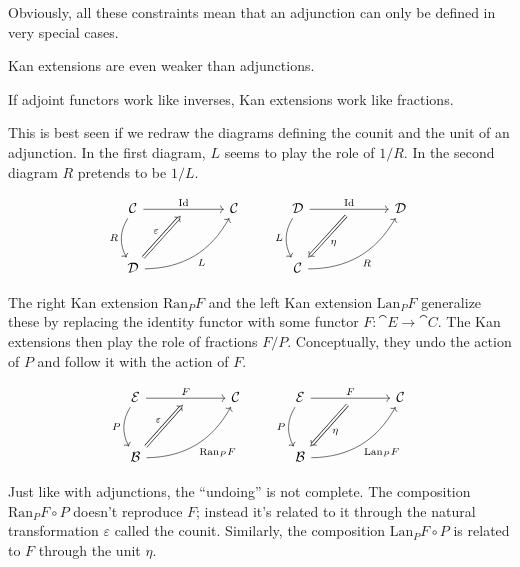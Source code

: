 \documentclass[DaoFP]{subfiles}
\begin{document}
Obviously, all these constraints mean that an adjunction can only be defined in very special cases. 

Kan extensions are even weaker than adjunctions. 

If adjoint functors work like inverses, Kan extensions work like fractions. 

This is best seen if we redraw the diagrams defining the counit and the unit of an adjunction. In the first diagram, $L$ seems to play the role of $1/R$. In the second diagram $R$ pretends to be $1/L$.

\[
 \begin{tikzcd} [row sep=1cm, column sep=1cm]
 \cat C
 \arrow[rr, "\text{Id}", "" {name=ID, below} ]
 \arrow[d, bend right, "R"']
 && \cat C
 \\
 \cat D
  \arrow[urr, bend right, "L"']
 \arrow[Rightarrow, "\varepsilon",  to=ID]
 \end{tikzcd}
 \qquad
 \begin{tikzcd} [row sep=1cm, column sep=1cm]
 \cat D
 \arrow[rr, "\text{Id}", "" {name=ID, below} ]
 \arrow[d, bend right, "L"']
 && \cat D
 \\
 \cat C
  \arrow[urr, bend right, "R"']
 \arrow[Rightarrow, "\eta",  from=ID]
 \end{tikzcd}
\]

The right Kan extension $\text{Ran}_P F$ and the left Kan extension $\text{Lan}_P F$ generalize these by replacing the identity functor with some functor $F \colon \cat E \to \cat C$. The Kan extensions then play the role of fractions $F/P$. Conceptually, they undo the action of $P$ and follow it with the action of $F$.

\[
 \begin{tikzcd} [row sep=1cm, column sep=1cm]
 \cat E
 \arrow[rr, "F", "" {name=ID, below} ]
 \arrow[d, bend right, "P"']
 && \cat C
 \\
 \cat B
  \arrow[urr, bend right, "\text{Ran}_P F"']
 \arrow[Rightarrow, "\varepsilon",  to=ID]
 \end{tikzcd}
 \qquad
 \begin{tikzcd} [row sep=1cm, column sep=1cm]
 \cat E
 \arrow[rr, "F", "" {name=ID, below} ]
 \arrow[d, bend right, "P"']
 && \cat C
 \\
 \cat B
  \arrow[urr, bend right, "\text{Lan}_P F"']
 \arrow[Rightarrow, "\eta",  from=ID]
 \end{tikzcd}
\]

Just like with adjunctions, the ``undoing'' is not complete. The composition $\text{Ran}_P F \circ P$ doesn't reproduce $F$; instead it's related to it through the natural transformation $\varepsilon$ called the counit. Similarly, the composition $\text{Lan}_P F \circ P$ is related to $F$ through the unit $\eta$.
\end{document}
